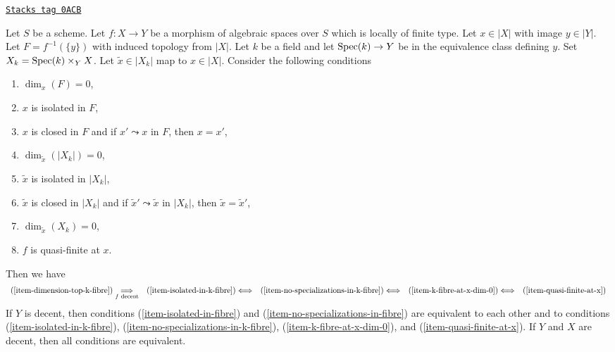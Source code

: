 \begin{lemma}
\label{decent-spaces-lemma-conditions-on-point-in-fibre-and-qf}
\href{https://stacks.math.columbia.edu/tag/0ACB}{\texttt{Stacks tag 0ACB}}

Let $S$ be a scheme. Let $f : X \to Y$ be a morphism of algebraic spaces
over $S$ which is locally of finite type. Let $x \in |X|$ with image
$y \in |Y|$. Let $F = f^{-1}(\{y\})$ with induced topology from $|X|$.
Let $k$ be a field and let $\operatorname{Spec}(k) \to Y$ be in the
equivalence class defining $y$. Set $X_k = \operatorname{Spec}(k) \times_Y X$.
Let $\tilde x \in |X_k|$ map to $x \in |X|$.
Consider the following conditions
\begin{enumerate}
\item
\label{decent-spaces-item-fibre-at-x-dim-0}
$\dim_x(F) = 0$,
\item
\label{decent-spaces-item-isolated-in-fibre}
$x$ is isolated in $F$,
\item
\label{decent-spaces-item-no-specializations-in-fibre}
$x$ is closed in $F$ and if $x' \leadsto x$ in $F$, then $x = x'$,
\item
\label{decent-spaces-item-dimension-top-k-fibre}
$\dim_{\tilde x}(|X_k|) = 0$,
\item
\label{decent-spaces-item-isolated-in-k-fibre}
$\tilde x$ is isolated in $|X_k|$,
\item
\label{decent-spaces-item-no-specializations-in-k-fibre}
$\tilde x$ is closed in $|X_k|$ and if $\tilde x' \leadsto \tilde x$
in $|X_k|$, then $\tilde x = \tilde x'$,
\item
\label{decent-spaces-item-k-fibre-at-x-dim-0}
$\dim_{\tilde x}(X_k) = 0$,
\item
\label{decent-spaces-item-quasi-finite-at-x}
$f$ is quasi-finite at $x$.
\end{enumerate}
Then we have
$$
\begin{array}{ccccc}(\ref{item-dimension-top-k-fibre}) \underset{f\text{ decent}}{\Longrightarrow} & (\ref{item-isolated-in-k-fibre}) \Longleftrightarrow & (\ref{item-no-specializations-in-k-fibre}) \Longleftrightarrow & (\ref{item-k-fibre-at-x-dim-0}) \Longleftrightarrow & (\ref{item-quasi-finite-at-x})\end{array}
$$
If $Y$ is decent, then conditions (\ref{item-isolated-in-fibre}) and
(\ref{item-no-specializations-in-fibre}) are equivalent to each other
and to conditions
(\ref{item-isolated-in-k-fibre}),
(\ref{item-no-specializations-in-k-fibre}),
(\ref{item-k-fibre-at-x-dim-0}), and
(\ref{item-quasi-finite-at-x}).
If $Y$ and $X$ are decent, then all conditions are equivalent.
\end{lemma}

